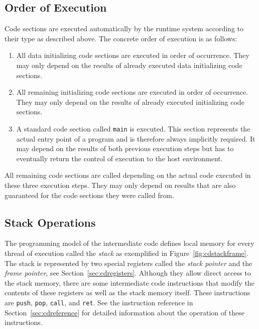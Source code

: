 \subsection{Order of Execution}

Code sections are executed automatically by the runtime system according to their type as described above.
The concrete order of execution is as follows:

\begin{enumerate}

\item
All data initializing code sections are executed in order of occurrence.
They may only depend on the results of already executed data initializing code sections.

\item
All remaining initializing code sections are executed in order of occurrence.
They may only depend on the results of already executed initializing code sections.

\item
A standard code section called \texttt{main} is executed.
This section represents the actual entry point of a program and is therefore always implicitly required.
It may depend on the results of both previous execution steps but has to eventually return the control of execution to the host environment.

\end{enumerate}

All remaining code sections are called depending on the actual code executed in these three execution steps.
They may only depend on results that are also guaranteed for the code sections they were called from.

\subsection{Stack Operations}\label{sec:cdstackoperations}

The programming model of the intermediate code defines local memory for every thread of execution called the \emph{stack} as exemplified in Figure~\ref{fig:cdstackframe}.
The stack is represented by two special registers called the \emph{stack pointer} and the \emph{frame pointer}, see Section~\ref{sec:cdregisters}.
Although they allow direct access to the stack memory, there are some intermediate code instructions that modify the contents of these registers as well as the stack memory itself.
These instructions are \texttt{push}, \texttt{pop}, \texttt{call}, and \texttt{ret}.
See the instruction reference in Section~\ref{sec:cdreference} for detailed information about the operation of these instructions.

